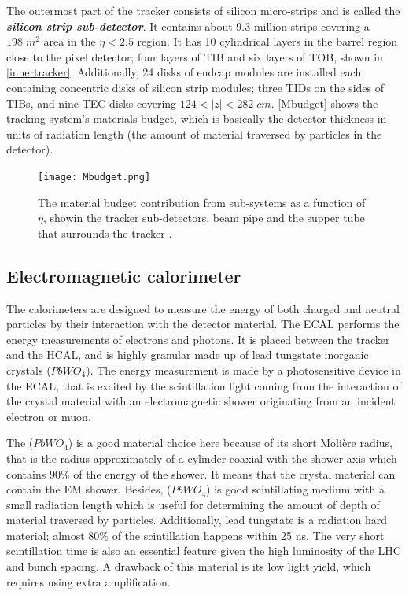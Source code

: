 The outermost part of the tracker consists of silicon micro-strips and is called the \textbf{\emph{silicon strip sub-detector}}. It contains about 9.3 million strips covering a $198\;m^2$ area in the $\eta < 2.5$ region. It has 10 cylindrical layers in the barrel region close to the pixel detector; four layers of TIB and six layers of TOB, shown in \autoref{innertracker}. Additionally, 24 disks of endcap modules are installed each containing concentric disks of silicon strip modules; three TIDs on the sides of TIBs, and nine TEC disks covering $124<|z|<282\;cm$. \autoref{Mbudget} shows the tracking system's materials budget, which is basically the detector thickness in units of radiation length (the amount of material traversed by particles in the detector).

\begin{figure}[ht]
	\centering
	\texttt{[image: Mbudget.png]}
	\vspace{2mm}
	\caption[The material budget contribution from sub-systems as a function of $\eta$, showin the tracker sub-detectors, beam pipe and the supper tube that surrounds the tracker.]{The material budget contribution from sub-systems as a function of $\eta$, showin the tracker sub-detectors, beam pipe and the supper tube that surrounds the tracker \cite{Mbudget}.}
	\label{Mbudget}
\end{figure}

\subsection{Electromagnetic calorimeter}\label{ecalsubsection}

The calorimeters are designed to measure the energy of both charged and neutral particles by their interaction with the detector material. The ECAL \cite{CERN-LHCC-97-033} performs the energy measurements of electrons and photons. It is placed between the tracker and the HCAL, and is highly granular made up of lead tungstate inorganic crystals ($PbWO_4$). The energy measurement is made by a photosensitive device in the ECAL, that is excited by the scintillation light coming from the interaction of the crystal material with an electromagnetic shower originating from an incident electron or muon.

The ($PbWO_4$) is a good material choice here because of its short Moli\`ere radius, that is the radius approximately of a cylinder coaxial with the shower axis which contains 90\% of the energy of the shower. It means that the crystal material can contain the EM shower. Besides, ($PbWO_4$) is good scintillating medium with a small radiation length which is useful for determining the amount of depth of material traversed by particles. Additionally, lead tungstate is a radiation hard material; almost 80\% of the scintillation happens within 25 ns. The very short scintillation time is also an essential feature given the high luminosity of the LHC and bunch spacing. A drawback of this material is its low light yield, which requires using extra amplification.

